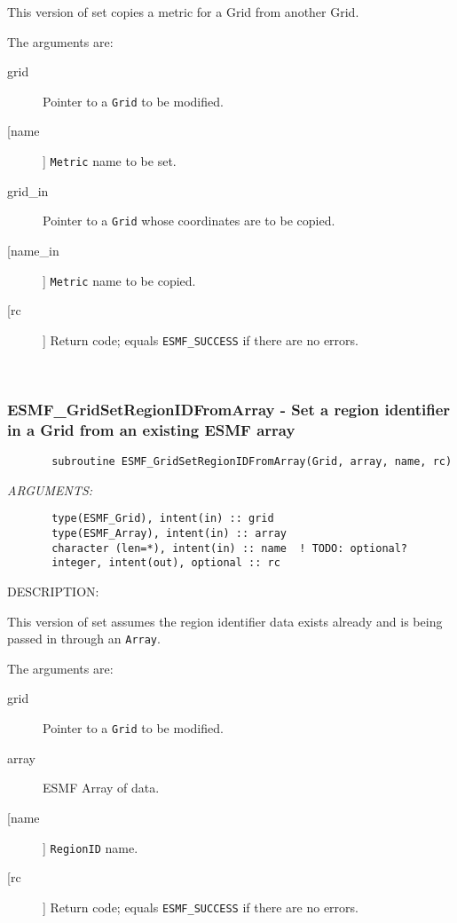 {       This version of set copies a metric for a Grid from another Grid.
  
       The arguments are:
       \begin{description}
       \item[grid] 
            Pointer to a {\tt Grid} to be modified.
       \item [[name]]
             {\tt Metric} name to be set.
       \item[grid\_in] 
            Pointer to a {\tt Grid} whose coordinates are to be copied.
       \item [[name\_in]]
             {\tt Metric} name to be copied.
       \item[[rc]] 
            Return code; equals {\tt ESMF\_SUCCESS} if there are no errors.
       \end{description}
   
 
\mbox{}\hrulefill\ 
 
\subsubsection{ESMF\_GridSetRegionIDFromArray - Set a region identifier in a Grid from an existing ESMF array}


 
\begin{verbatim}       subroutine ESMF_GridSetRegionIDFromArray(Grid, array, name, rc)\end{verbatim}{\em ARGUMENTS:}
\begin{verbatim}       type(ESMF_Grid), intent(in) :: grid
       type(ESMF_Array), intent(in) :: array
       character (len=*), intent(in) :: name  ! TODO: optional?
       integer, intent(out), optional :: rc            \end{verbatim}
{\sf DESCRIPTION:\\ }


       This version of set assumes the region identifier data exists already
       and is being passed in through an {\tt Array}.
  
       The arguments are:
       \begin{description}
       \item[grid] 
            Pointer to a {\tt Grid} to be modified.
       \item[array]
            ESMF Array of data.
       \item [[name]]
             {\tt RegionID} name.
       \item[[rc]] 
            Return code; equals {\tt ESMF\_SUCCESS} if there are no errors.
       \end{description}
   
}
